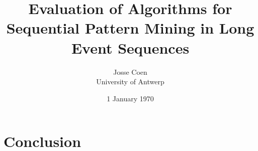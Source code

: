 \documentclass{scrartcl}
\theoremstyle{definition}
\begin{document}
\frenchspacing

\title{Evaluation of Algorithms for Sequential Pattern Mining in Long Event Sequences}
\subtitle{}

\author{Josse Coen
\vspace{.3cm}\\
%
University of Antwerp
%
}

\date{1 January 1970}



% 




\newpage



\newpage


% 


\section{Conclusion}
\end{document}
